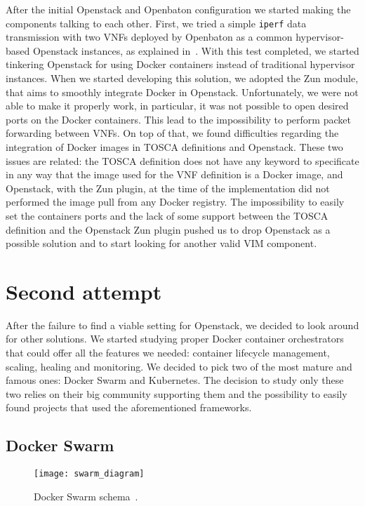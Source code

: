 After the initial Openstack and Openbaton configuration we started making the
components talking to each other. First, we tried a simple \verb!iperf! data
transmission with two VNFs deployed by Openbaton as a common hypervisor-based
Openstack instances, as explained in~\cite{openbatonIperf}. With this test
completed, we started tinkering Openstack for using Docker containers instead of
traditional hypervisor instances. When we started developing this solution, we
adopted the Zun module, that aims to smoothly integrate Docker in Openstack.
Unfortunately, we were not able to make it properly work, in particular, it was
not possible to open desired ports on the Docker containers. This lead to the
impossibility to perform packet forwarding between VNFs. On top of that, we
found difficulties regarding the integration of Docker images in TOSCA
definitions and Openstack. These two issues are related: the TOSCA definition
does not have any keyword to specificate in any way that the image used for the
VNF definition is a Docker image, and Openstack, with the Zun plugin, at the
time of the implementation did not performed the image pull from any Docker
registry. The impossibility to easily set the containers ports and the lack of
some support between the TOSCA definition and the Openstack Zun plugin pushed us
to drop Openstack as a possible solution and to start looking for another valid
VIM component.

\section{Second attempt}

After the failure to find a viable setting for Openstack, we decided to look
around for other solutions. We started studying proper Docker container
orchestrators that could offer all the features we needed: container lifecycle
management, scaling, healing and monitoring. We decided to pick two of the most
mature and famous ones: Docker Swarm and Kubernetes. The decision to study only
these two relies on their big community supporting them and the possibility to
easily found projects that used the aforementioned frameworks.

\subsection{Docker Swarm}

\begin{figure}[t]
  \centering
  \texttt{[image: swarm\_diagram]}
  \caption[Docker Swarm schema]{Docker Swarm schema~\cite{dockerSwarmWiki}.}
  \label{chap:archimpl:sec:secondattempt:img:dockerswarm}
\end{figure}

